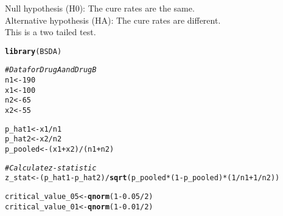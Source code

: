 \documentclass{article}\usepackage[]{graphicx}\usepackage[]{xcolor}
\makeatletter
\newcommand{\hlnum}[1]{\textcolor[rgb]{0.686,0.059,0.569}{#1}}%
\newcommand{\hlcom}[1]{\textcolor[rgb]{0.678,0.584,0.686}{\textit{#1}}}%
\newcommand{\hlopt}[1]{\textcolor[rgb]{0,0,0}{#1}}%
\newcommand{\hldef}[1]{\textcolor[rgb]{0.345,0.345,0.345}{#1}}%
\newcommand{\hlkwb}[1]{\textcolor[rgb]{0.69,0.353,0.396}{#1}}%
\newcommand{\hlkwd}[1]{\textcolor[rgb]{0.737,0.353,0.396}{\textbf{#1}}}%
\newenvironment{kframe}{%
 \def\at@end@of@kframe{}%
 \ifinner\ifhmode%
  \def\at@end@of@kframe{\end{minipage}}%
  \begin{minipage}{\columnwidth}%
 \fi\fi%
 \def\FrameCommand##1{\hskip\@totalleftmargin \hskip-\fboxsep
 \colorbox{shadecolor}{##1}\hskip-\fboxsep
     \hskip-\linewidth \hskip-\@totalleftmargin \hskip\columnwidth}%
 \MakeFramed {\advance\hsize-\width
   \@totalleftmargin\z@ \linewidth\hsize
   \@setminipage}}%
 {\par\unskip\endMakeFramed%
 \at@end@of@kframe}
\newenvironment{knitrout}{}{} %
\makeatother
\begin{document}
Null hypothesis (H0): The cure rates are the same.\\
Alternative hypothesis (HA): The cure rates are different.\\

This is a two tailed test.\\
\begin{knitrout}
\color{fgcolor}\begin{kframe}
\begin{alltt}
\hlkwd{library}\hldef{(BSDA)}

\hlcom{# Data for Drug A and Drug B}
\hldef{n1} \hlkwb{<-} \hlnum{190}
\hldef{x1} \hlkwb{<-} \hlnum{100}
\hldef{n2} \hlkwb{<-} \hlnum{65}
\hldef{x2} \hlkwb{<-} \hlnum{55}

\hldef{p_hat1} \hlkwb{<-} \hldef{x1} \hlopt{/} \hldef{n1}
\hldef{p_hat2} \hlkwb{<-} \hldef{x2} \hlopt{/} \hldef{n2}
\hldef{p_pooled} \hlkwb{<-} \hldef{(x1} \hlopt{+} \hldef{x2)} \hlopt{/} \hldef{(n1} \hlopt{+} \hldef{n2)}

\hlcom{# Calculate z-statistic}
\hldef{z_stat} \hlkwb{<-} \hldef{(p_hat1} \hlopt{-} \hldef{p_hat2)} \hlopt{/} \hlkwd{sqrt}\hldef{(p_pooled} \hlopt{*} \hldef{(}\hlnum{1} \hlopt{-} \hldef{p_pooled)} \hlopt{*} \hldef{(}\hlnum{1}\hlopt{/}\hldef{n1} \hlopt{+} \hlnum{1}\hlopt{/}\hldef{n2))}

\hldef{critical_value_05} \hlkwb{<-} \hlkwd{qnorm}\hldef{(}\hlnum{1} \hlopt{-} \hlnum{0.05} \hlopt{/} \hlnum{2}\hldef{)}
\hldef{critical_value_01} \hlkwb{<-} \hlkwd{qnorm}\hldef{(}\hlnum{1} \hlopt{-} \hlnum{0.01} \hlopt{/} \hlnum{2}\hldef{)}


\end{alltt}
\end{kframe}
\end{knitrout}
\end{document}
